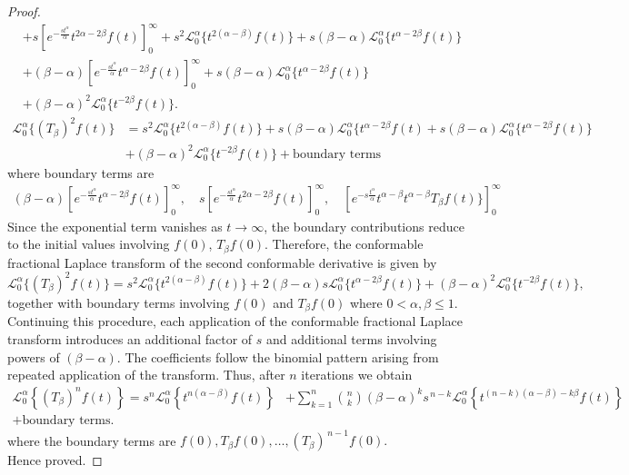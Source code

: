 \documentclass[two side,reqno,12pt]{amsart}
\numberwithin{equation}{section}
\theoremstyle{definition}
\begin{document}
\begin{proof}
\begin{align*}
& + s\left[e^{-\frac{s t^{\alpha}}{\alpha}} t^{2\alpha-2\beta}f(t)\right]_{0}^{\infty}
+s^2\mathcal{L}_0^{\alpha}\{t^{2(\alpha-\beta)}f(t)\}
+s(\beta-\alpha)\mathcal{L}_0^{\alpha}\{t^{\alpha-2\beta}f(t)\}\\
&+ (\beta-\alpha)\left[e^{-\frac{s t^{\alpha}}{\alpha}} t^{\alpha-2\beta}f(t)\right]_{0}^{\infty}
+s(\beta-\alpha)\mathcal{L}_0^{\alpha}\{t^{\alpha-2\beta}f(t)\}\\
&+(\beta-\alpha)^2\mathcal{L}_0^{\alpha}\{t^{-2\beta}f(t)\}.
\end{align*}
\begin{align*}
\mathcal{L}_0^{\alpha}\{(T_{\beta})^{2}f(t)\}
&=s^2\mathcal{L}_0^{\alpha}\{t^{2(\alpha-\beta)}f(t)\}
+s(\beta-\alpha)\mathcal{L}_0^{\alpha}\{t^{\alpha-2\beta}f(t)
+s(\beta-\alpha)\mathcal{L}_0^{\alpha}\{t^{\alpha-2\beta}f(t)\}\\
&+(\beta-\alpha)^2\mathcal{L}_0^{\alpha}\{t^{-2\beta}f(t)\}
+ \text{boundary terms}
\end{align*}
where boundary terms are
\begin{align*}
 (\beta-\alpha)\left[e^{-\frac{s t^{\alpha}}{\alpha}} t^{\alpha-2\beta}f(t)\right]_{0}^{\infty},\quad
 s\left[e^{-\frac{s t^{\alpha}}{\alpha}} t^{2\alpha-2\beta}f(t)\right]_{0}^{\infty},
 \quad\left[e^{-s\frac{t^{\alpha}}{\alpha}}t^{\alpha-\beta}t^{\alpha-\beta}T_{\beta}f(t)\}\right]_{0}^{\infty}
\end{align*}
Since the exponential term vanishes as $t \to \infty$, the boundary contributions reduce to the initial values involving
$
f(0)$, $T_{\beta}f(0).$
 Therefore, the conformable fractional Laplace transform of the second conformable derivative is given by
\[
\mathcal{L}_0^{\alpha}\{(T_{\beta})^{2}f(t)\}
=
s^{2}\mathcal{L}_0^{\alpha}\{t^{2(\alpha-\beta)}f(t)\}
+2(\beta-\alpha)s\mathcal{L}_0^{\alpha}\{t^{\alpha-2\beta}f(t)\}
+(\beta-\alpha)^{2}\mathcal{L}_0^{\alpha}\{t^{-2\beta}f(t)\},
\]
together with boundary terms involving $f(0)$ and $T_{\beta}f(0)$ where $0<\alpha,\beta\le1$.\\
Continuing this procedure, each application of the conformable fractional Laplace transform introduces an additional factor of $s$ and additional terms involving powers of $(\beta-\alpha)$. The coefficients follow the binomial pattern arising from repeated application of the transform.
Thus, after $n$ iterations we obtain
\begin{align*}
\mathcal{L}_0^{\alpha} \left\{ (T_\beta)^n f(t) \right\} = s^n \mathcal{L}_0^{\alpha} \left\{ t^{n(\alpha-\beta)} f(t) \right\} 
&+ \sum_{k=1}^n \binom{n}{k} (\beta-\alpha)^k s^{\,n-k} \mathcal{L}_0^{\alpha} \left\{ t^{(n-k)(\alpha-\beta)-k\beta} f(t) \right\} \\
+ \text{boundary terms}.
\end{align*}
where the boundary terms are
$
f(0), T_\beta f(0), \ldots, (T_\beta)^{\,n-1} f(0).
$\\
Hence proved. 
\end{proof}
\end{document}
